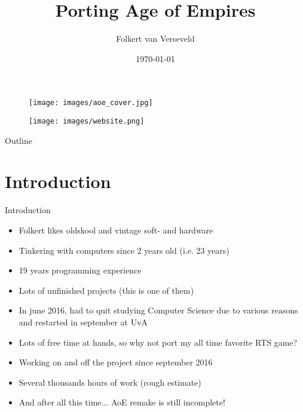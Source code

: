 \documentclass{beamer}
\title[Preserving and opensourcing RTS video games]{Porting Age of Empires}
\author{Folkert van Verseveld}
\institute{University of Amsterdam}
\date{\today}
\begin{document}

\begin{frame}
  \titlepage
\end{frame}


\begin{frame}
	\begin{figure}
	\texttt{[image: images/aoe\_cover.jpg]}
	\end{figure}

\end{frame}


\begin{frame}
	\begin{figure}
	\texttt{[image: images/website.png]}
	\end{figure}

\end{frame}

\begin{frame}{Outline}
	\tableofcontents
\end{frame}


\section{Introduction}

\begin{frame}{Introduction}
	\begin{itemize}
		\item Folkert likes oldskool and vintage soft- and hardware
		\item Tinkering with computers since 2 years old (i.e. 23 years)
		\item 19 years programming experience
		\item Lots of unfinished projects (this is one of them)
		\item In june 2016, had to quit studying Computer Science due to various reasons and restarted in september at UvA
		\item Lots of free time at hands, so why not port my all time favorite RTS game?
		\item Working on and off the project since september 2016
		\item Several thousands hours of work (rough estimate)
		\item And after all this time... AoE remake is still incomplete!
	\end{itemize}
\end{frame}
\end{document}
